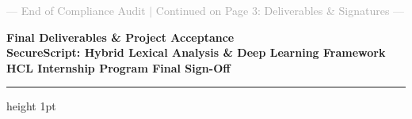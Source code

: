 \documentclass[11pt,a4paper]{article}
\begin{document}
\vfill
\begin{center}
\footnotesize \textcolor{darkgray}{--- End of Compliance Audit $\vert$ Continued on Page 3: Deliverables & Signatures ---}
\end{center}

\newpage

\begin{center}
    {\LARGE \textbf{\color{primaryblue} Final Deliverables & Project Acceptance}} \\[0.25em]
    {\large \textbf{SecureScript: Hybrid Lexical Analysis \& Deep Learning Framework}} \\[0.2em]
    {\footnotesize \textbf{HCL Internship Program Final Sign-Off}}
\end{center}

\vspace{0.3em}
\hrule height 1pt
\vspace{0.8em}
\end{document}

